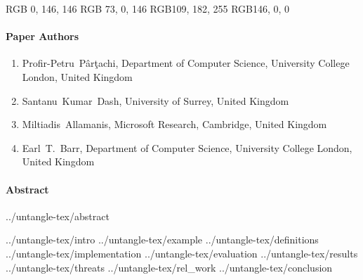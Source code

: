 \definecolor{cb-green-sea}  {RGB}{  0, 146, 146}
\definecolor{cb-purple}     {RGB}{ 73,   0, 146}
\definecolor{cb-blue-sky}   {RGB}{109, 182, 255}
\definecolor{cb-burgundy}   {RGB}{146,   0,   0}


\paragraph{Paper Authors}%
\begin{enumerate}
    \item[] Profir-Petru~P\^ar\c{t}achi, Department of Computer Science, University College London, United Kingdom
    \item[] Santanu~Kumar~Dash, University of Surrey, United Kingdom
    \item[] Miltiadis~Allamanis, Microsoft Research, Cambridge, United Kingdom
    \item[] Earl~T.~Barr, Department of Computer Science, University College London, United Kingdom
\end{enumerate}

\paragraph{Abstract}
{../untangle-tex/abstract}

{../untangle-tex/intro}
{../untangle-tex/example}
{../untangle-tex/definitions}
{../untangle-tex/implementation}
{../untangle-tex/evaluation}
{../untangle-tex/results}
{../untangle-tex/threats}
{../untangle-tex/rel_work}
{../untangle-tex/conclusion}